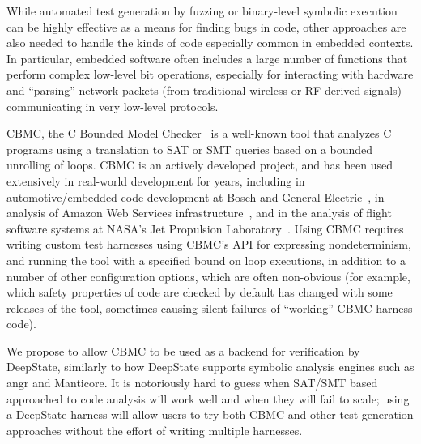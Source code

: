 While automated test generation by fuzzing or binary-level symbolic execution can be highly effective as a means for finding bugs in code, other approaches are also needed to handle the kinds of code especially common in embedded contexts.  In particular, embedded software often includes a large number of functions that perform complex low-level bit operations, especially for interacting with hardware and ``parsing'' network packets (from traditional wireless or RF-derived signals) communicating in very low-level protocols.

CBMC, the C Bounded Model Checker~\cite{cbmcp} is a well-known tool that analyzes C programs using a translation to SAT or SMT queries based on a bounded unrolling of loops. CBMC is an actively developed project, and has been used extensively in real-world development for years, including in automotive/embedded code development at Bosch and General Electric~\cite{tiemeyer2019crest}, in analysis of Amazon Web Services infrastructure~\cite{awsmodel}, and in the analysis of flight software systems at NASA's Jet Propulsion Laboratory~\cite{CFV08}.  Using CBMC requires writing custom test harnesses using CBMC's API for expressing nondeterminism, and running the tool with a specified bound on loop executions, in addition to a number of other configuration options, which are often non-obvious (for example, which safety properties of code are checked by default has changed with some releases of the tool, sometimes causing silent failures of ``working'' CBMC harness code).

We propose to allow CBMC to be used as a backend for verification by DeepState, similarly to how DeepState supports symbolic analysis engines such as angr and Manticore.  It is notoriously hard to guess when SAT/SMT based approached to code analysis will work well and when they will fail to scale; using a DeepState harness will allow users to try both CBMC and other test generation approaches without the effort of writing multiple harnesses.  